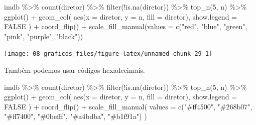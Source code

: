 \documentclass[
]{book}
\newenvironment{Shaded}{\begin{snugshade}}{\end{snugshade}}
\newcommand{\AttributeTok}[1]{\textcolor[rgb]{0.77,0.63,0.00}{#1}}
\newcommand{\ConstantTok}[1]{\textcolor[rgb]{0.00,0.00,0.00}{#1}}
\newcommand{\DecValTok}[1]{\textcolor[rgb]{0.00,0.00,0.81}{#1}}
\newcommand{\FunctionTok}[1]{\textcolor[rgb]{0.00,0.00,0.00}{#1}}
\newcommand{\NormalTok}[1]{#1}
\newcommand{\SpecialCharTok}[1]{\textcolor[rgb]{0.00,0.00,0.00}{#1}}
\newcommand{\StringTok}[1]{\textcolor[rgb]{0.31,0.60,0.02}{#1}}
\begin{document}
\begin{Shaded}
\begin{Highlighting}[]
\NormalTok{imdb }\SpecialCharTok{\%\textgreater{}\%} 
  \FunctionTok{count}\NormalTok{(diretor) }\SpecialCharTok{\%\textgreater{}\%}
  \FunctionTok{filter}\NormalTok{(}\SpecialCharTok{!}\FunctionTok{is.na}\NormalTok{(diretor)) }\SpecialCharTok{\%\textgreater{}\%} 
  \FunctionTok{top\_n}\NormalTok{(}\DecValTok{5}\NormalTok{, n) }\SpecialCharTok{\%\textgreater{}\%}
  \FunctionTok{ggplot}\NormalTok{() }\SpecialCharTok{+}
  \FunctionTok{geom\_col}\NormalTok{(}
    \FunctionTok{aes}\NormalTok{(}\AttributeTok{x =}\NormalTok{ diretor, }\AttributeTok{y =}\NormalTok{ n, }\AttributeTok{fill =}\NormalTok{ diretor),}
    \AttributeTok{show.legend =} \ConstantTok{FALSE}
\NormalTok{  ) }\SpecialCharTok{+}
  \FunctionTok{coord\_flip}\NormalTok{() }\SpecialCharTok{+}
  \FunctionTok{scale\_fill\_manual}\NormalTok{(}\AttributeTok{values =} \FunctionTok{c}\NormalTok{(}\StringTok{"red"}\NormalTok{, }\StringTok{"blue"}\NormalTok{, }\StringTok{"green"}\NormalTok{, }\StringTok{"pink"}\NormalTok{, }\StringTok{"purple"}\NormalTok{, }\StringTok{"black"}\NormalTok{))}
\end{Highlighting}
\end{Shaded}

\begin{center}\texttt{[image: 08-graficos\_files/figure-latex/unnamed-chunk-29-1]} \end{center}

Também podemos usar códigos hexadecimais.

\begin{Shaded}
\begin{Highlighting}[]
\NormalTok{imdb }\SpecialCharTok{\%\textgreater{}\%} 
  \FunctionTok{count}\NormalTok{(diretor) }\SpecialCharTok{\%\textgreater{}\%}
  \FunctionTok{filter}\NormalTok{(}\SpecialCharTok{!}\FunctionTok{is.na}\NormalTok{(diretor)) }\SpecialCharTok{\%\textgreater{}\%} 
  \FunctionTok{top\_n}\NormalTok{(}\DecValTok{5}\NormalTok{, n) }\SpecialCharTok{\%\textgreater{}\%}
  \FunctionTok{ggplot}\NormalTok{() }\SpecialCharTok{+}
  \FunctionTok{geom\_col}\NormalTok{(}
    \FunctionTok{aes}\NormalTok{(}\AttributeTok{x =}\NormalTok{ diretor, }\AttributeTok{y =}\NormalTok{ n, }\AttributeTok{fill =}\NormalTok{ diretor),}
    \AttributeTok{show.legend =} \ConstantTok{FALSE}
\NormalTok{  ) }\SpecialCharTok{+}
  \FunctionTok{coord\_flip}\NormalTok{() }\SpecialCharTok{+}
  \FunctionTok{scale\_fill\_manual}\NormalTok{(}
    \AttributeTok{values =} \FunctionTok{c}\NormalTok{(}\StringTok{"\#ff4500"}\NormalTok{, }\StringTok{"\#268b07"}\NormalTok{, }\StringTok{"\#ff7400"}\NormalTok{, }\StringTok{"\#0befff"}\NormalTok{, }\StringTok{"\#a4bdba"}\NormalTok{, }\StringTok{"\#b1f91a"}\NormalTok{)}
\NormalTok{  )}
\end{Highlighting}
\end{Shaded}
\end{document}
